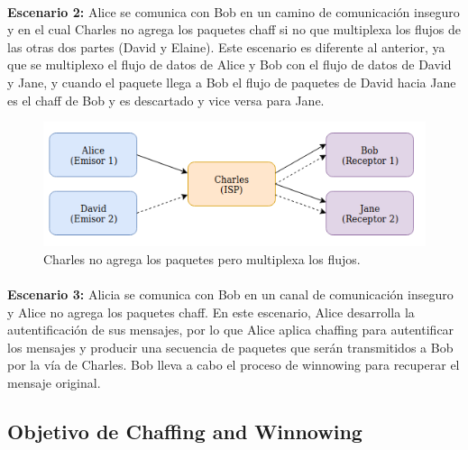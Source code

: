 \documentclass[12pt, a4paper, titlepage]{report}
\begin{document}
		\paragraph{}
		\textbf{Escenario 2:} Alice se comunica con Bob en un camino de comunicación inseguro y en el cual Charles no agrega los paquetes chaff si no que multiplexa los flujos de las otras dos partes (David y Elaine). Este escenario es diferente al anterior, ya que se multiplexo el flujo de datos de Alice y Bob con el flujo de datos de David y Jane, y cuando el paquete llega a Bob el flujo de paquetes de David hacia Jane es el chaff de Bob y es descartado y vice versa para Jane.
		
		\begin{figure}[H]
			\begin{center}	                  \includegraphics[width=14cm]{./imagenes/MarcoTeorico/escenario2.png}
				\caption{Charles no agrega los paquetes pero multiplexa los flujos.}
			\end{center}
		\end{figure}
		
		\paragraph{}
		\textbf{Escenario 3:} Alicia se comunica con Bob en un canal de comunicación inseguro y Alice no agrega los paquetes chaff. En este escenario, Alice desarrolla la autentificación de sus mensajes, por lo que Alice aplica chaffing para autentificar los mensajes y producir una secuencia de paquetes que serán transmitidos a Bob por la vía de Charles. Bob lleva a cabo el proceso de winnowing para recuperar el mensaje original.
		
		\subsection{Objetivo de Chaffing and Winnowing}
		
\end{document}
